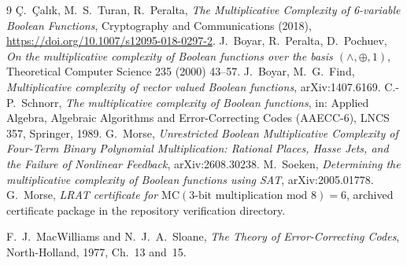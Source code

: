 \documentclass[11pt,a4paper]{article}
\theoremstyle{plain}
\theoremstyle{remark}
\begin{document}
\begingroup\raggedright
\begin{thebibliography}{9}
 \c{C}.~\c{C}al{\i}k, M.~S.\ Turan, R.~Peralta, \emph{The Multiplicative Complexity of 6-variable Boolean Functions}, Cryptography and Communications (2018), \url{https://doi.org/10.1007/s12095-018-0297-2}.
 J.~Boyar, R.~Peralta, D.~Pochuev, \emph{On the multiplicative complexity of Boolean functions over the basis $(\wedge,\oplus,1)$}, Theoretical Computer Science 235 (2000) 43--57.
 J.~Boyar, M.~G.~Find, \emph{Multiplicative complexity of vector valued Boolean functions}, arXiv:1407.6169.
 C.-P.~Schnorr, \emph{The multiplicative complexity of Boolean functions}, in: Applied Algebra, Algebraic Algorithms and Error-Correcting Codes (AAECC-6), LNCS 357, Springer, 1989.
 G.~Morse, \emph{Unrestricted Boolean Multiplicative Complexity of Four-Term Binary Polynomial Multiplication: Rational Places, Hasse Jets, and the Failure of Nonlinear Feedback}, arXiv:2608.30238.
 M.~Soeken, \emph{Determining the multiplicative complexity of Boolean functions using SAT}, arXiv:2005.01778.
 G.~Morse, \emph{LRAT certificate for $\mathrm{MC}(3\text{-bit multiplication mod }8)=6$}, archived certificate package in the repository verification directory.

 F.~J.~MacWilliams and N.~J.~A.~Sloane, \emph{The Theory of Error-Correcting Codes}, North-Holland, 1977, Ch.~13 and~15.
\end{thebibliography}
\endgroup
\end{document}
